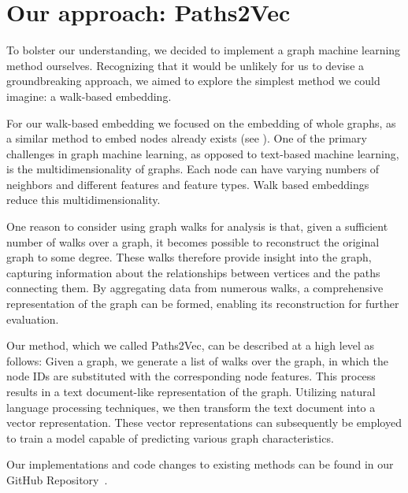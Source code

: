 \section{Our approach: Paths2Vec}

To bolster our understanding, we decided to implement a graph machine learning method ourselves. Recognizing that it would be unlikely for us to devise a groundbreaking approach, we aimed to explore the simplest method we could imagine: a walk-based embedding.

For our walk-based embedding we focused on the embedding of whole graphs, as a similar method to embed nodes already exists (see \cite{2016node2vec}). One of the primary challenges in graph machine learning, as opposed to text-based machine learning, is the multidimensionality of graphs. Each node can have varying numbers of neighbors and different features and feature types. Walk based embeddings reduce this multidimensionality.

One reason to consider using graph walks for analysis is that, given a sufficient number of walks over a graph, it becomes possible to reconstruct the original graph to some degree\cite{Wittmann2009reconstruction}. These walks therefore provide insight into the graph, capturing information about the relationships between vertices and the paths connecting them. By aggregating data from numerous walks, a comprehensive representation of the graph can be formed, enabling its reconstruction for further evaluation.

Our method, which we called Paths2Vec, can be described at a high level as follows: Given a graph, we generate a list of walks over the graph, in which the node IDs are substituted with the corresponding node features. This process results in a text document-like representation of the graph. Utilizing natural language processing techniques, we then transform the text document into a vector representation. These vector representations can subsequently be employed to train a model capable of predicting various graph characteristics.

Our implementations and code changes to existing methods can be found in our GitHub Repository~\cite{our_repo}.

